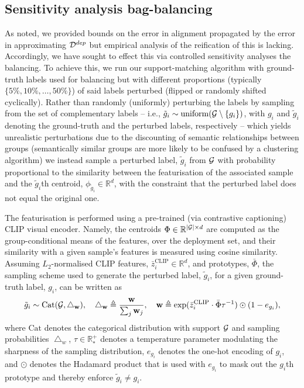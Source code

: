 \subsection{Sensitivity analysis \wrt{} bag-balancing}
%
As noted, we provided bounds on the error in alignment propagated by the error in
approximating \( {\mathcal{D}}^{dep}\) but empirical analysis of the reification of this is lacking. 
%
Accordingly, we have sought to effect this via controlled sensitivity analyses \wrt{} the
balancing.
To achieve this, we run our support-matching algorithm with ground-truth labels used for balancing
but with different proportions (typically \( \{5\%, 10\%, \dots, 50\%\} \)) of said labels
perturbed (flipped or randomly shifted cyclically). 
%
Rather than randomly (uniformly) perturbing the labels by sampling from the set of complementary
labels -- i.e., \( \tilde{g}_i \sim \mathrm{uniform}({\mathcal{G}} \setminus \{g_i\}) \), with \( g_i \) and
\( \tilde{g}_i \) denoting the ground-truth and the perturbed labels, respectively -- which yields
unrealistic perturbations due to the discounting of semantic relationships between groups
(semantically similar groups are more likely to be confused by a clustering algorithm) we instead
sample a perturbed label, $\tilde{g}_i$ from ${\mathcal{G}}$ with probability proportional to the similarity
between the featurisation of the associated sample and the \(\tilde{g}_i\)th centroid, \(
\phi_{\tilde{g}_i} \in \mathbb{R}^d \), with the constraint that the perturbed label does not equal
the original one. 

%
The featurisation is performed using a pre-trained (via contrastive captioning) CLIP
\citep{radford2021learning} visual encoder. 
%
Namely, the centroids \( \Phi \in \mathbb{R}^{|{\mathcal{G}}| \times d} \) are computed as the
group-conditional means of the features, over the deployment set, and their similarity with a
given sample's features is measured using cosine similarity. 
%
Assuming \(L_2\)-normalised CLIP features, $\bar z_i^\text{CLIP} \in \mathbb{R}^d$, and prototypes,
$\bar \Phi$, the sampling scheme used to generate the perturbed label, $\tilde{g}_i$, for a given
ground-truth label, $g_i$, can be written as
%
\begin{align}
  \tilde{g}_i \sim \text{Cat}({\mathcal{G}}, \bigtriangleup_\mathbf{w} ), \quad
  \bigtriangleup_\mathbf{w} \triangleq  \frac{\mathbf{w}}{\sum_j \mathbf{w}_j} , \quad
  \mathbf{w} \triangleq \text{exp}(\bar z_i^\text{CLIP} \cdot \bar \Phi \tau^{-1})
  \odot (1 - e_{g_i}),
\end{align}
%
where \( \text{Cat} \) denotes the categorical distribution with support \({\mathcal{G}}\) and sampling
probabilities \( \bigtriangleup_w \), \( \tau \in \mathbb{R}^+_\ast \) denotes a temperature
parameter modulating the sharpness of the sampling distribution, \(e_{g_i}\) denotes the one-hot
encoding of \(g_i\), and \(\odot\) denotes the Hadamard product that is used with \(e_{g_i}\) to
mask out the \(g_i\)th prototype and thereby enforce \( \tilde{g}_i \neq g_i \).
%
